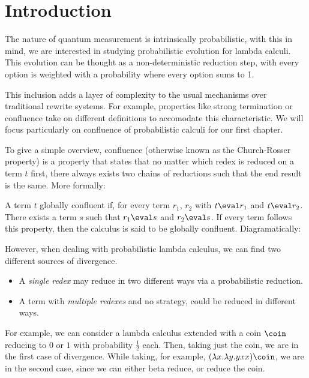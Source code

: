 \section{Introduction}
The nature of quantum measurement is intrinsically probabilistic, with this in mind, we are interested in studying probabilistic evolution for lambda calculi. This evolution can be thought as a non-deterministic reduction step, with every option is weighted with a probability where every option sums to 1.

This inclusion adds a layer of complexity to the usual mechanisms over traditional rewrite systems. For example, properties like strong termination or confluence take on different definitions to accomodate this characteristic. We will focus particularly on confluence of probabilistic calculi for our first chapter.

To give a simple overview, confluence (otherwise known as the Church-Rosser property) is a property that states that no matter which redex is reduced on a term $t$ first, there always exists two chains of reductions such that the end result is the same. More formally:

\begin{definition}[Confluence]
A term $t$ globally confluent if, for every term $r_1$, $r_2$ with $t\eval r_1$ and $t\eval r_2$. There exists a term $s$ such that $r_1\eval s$ and $r_2\eval s$. If every term follows this property, then the calculus is said to be globally confluent. Diagramatically:
\begin{center}    
\end{center}
\end{definition}

However, when dealing with probabilistic lambda calculus, we can find two different sources of divergence.
\begin{itemize}
\item A \textit{single redex} may reduce in two different ways via a probabilistic reduction.
\item A term with \textit{multiple redexes} and no strategy, could be reduced in different ways.
\end{itemize}
For example, we can consider a lambda calculus extended with a coin $\coin$ reducing to $0$ or $1$ with probability $\frac 12$ each. Then, taking just the coin, we are in the first case of divergence. While taking, for example, $(\lambda x.\lambda y.yxx)\coin$, we are in the second case, since we can either beta reduce, or reduce the coin.

